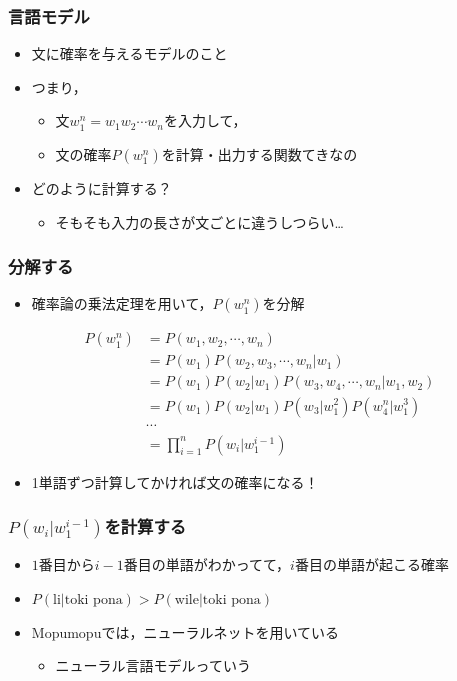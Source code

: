 \documentclass[14pt]{beamer}
\begin{document}
\begin{frame}
	\frametitle{言語モデル}

	\begin{itemize}
		\item 文に確率を与えるモデルのこと
		\item つまり，
			\begin{itemize}
				\item 文$w_1^n = w_1 w_2 \cdots w_n$を入力して，
				\item 文の確率$P(w_1^n)$を計算・出力する関数てきなの
			\end{itemize}
		\item どのように計算する？
			\begin{itemize}
				\item そもそも入力の長さが文ごとに違うしつらい…
			\end{itemize}
	\end{itemize}
\end{frame}

\begin{frame}
	\frametitle{分解する}

	\begin{itemize}
		\item 確率論の乗法定理を用いて，$P(w_1^n)$を分解
	\end{itemize}
	\begin{align*}
		P(w_1^n)
			& = P(w_1, w_2, \cdots, w_n) \\
			& = P(w_1) P(w_2, w_3, \cdots, w_n | w_1) \\
			& = P(w_1) P(w_2 | w_1) P(w_3, w_4, \cdots, w_n | w_1, w_2) \\
			& = P(w_1) P(w_2 | w_1) P(w_3 | w_1^2) P(w_4^n | w_1^3) \\
			& \cdots \\
			& = \prod_{i=1}^{n} P(w_i | w_1^{i-1})
	\end{align*}

	\begin{itemize}
		\item 1単語ずつ計算してかければ文の確率になる！
	\end{itemize}

\end{frame}

\begin{frame}
	\frametitle{$P(w_i | w_1^{i-1})$を計算する}

	\begin{itemize}
		\item $1$番目から$i-1$番目の単語がわかってて，$i$番目の単語が起こる確率
		\item $P(\text{li} | \text{toki pona}) > P(\text{wile} | \text{toki pona})$ 
		\item Mopumopuでは，ニューラルネットを用いている
			\begin{itemize}
				\item ニューラル言語モデルっていう
			\end{itemize}
	\end{itemize}
\end{frame}
\end{document}
